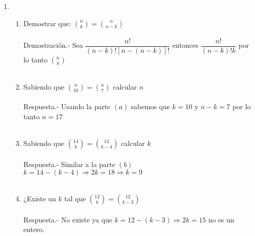 \begin{enumerate}[ \bfseries 1.]
\item 
\begin{enumerate}[\bfseries (a)]
\item Demostrar que: ${n \choose k} = {n \choose n-k}$\\\\
Demostración.- \; Sea $\dfrac{n!}{(n-k)!\left[ n - (n-k) \right]!}$ entonces $\dfrac{n!}{(n-k)!k}$ por lo tanto ${n \choose k}$\\\\

\item Sabiendo que ${n \choose 10} = {n \choose 7}$ calcular $n$\\\\
Respuesta.- \;  Usando la parte $(a)$ sabemos que $k=10$ y $n-k=7$ por lo tanto $n=17$\\\\

\item Sabiendo que ${14 \choose k} = {14 \choose k - 4}$ calcular $k$\\\\ 
Respuesta.- \; Similar a la parte $(b)$ $k=14 - (k-4) \Rightarrow 2k=18 \Rightarrow k =9$\\\\

\item ¿Existe un $k$ tal que ${12 \choose k} = {12 \choose k-3}$\\\\
Respuesta.- \; No existe ya que $k=12 - (k-3) \Rightarrow 2k=15$ no es un entero.\\\\
\end{enumerate}


\end{enumerate}
